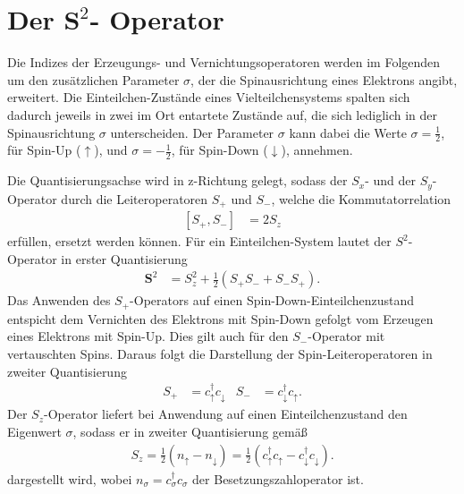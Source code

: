 \section{Der \texorpdfstring{$\symbf{S}^2$}{TEXT}- Operator}

Die Indizes der Erzeugungs- und Vernichtungsoperatoren werden im Folgenden um den zusätzlichen Parameter $\sigma$, der die Spinausrichtung eines Elektrons angibt, erweitert.
Die Einteilchen-Zustände eines Vielteilchensystems spalten sich dadurch jeweils in zwei im Ort entartete Zustände auf, die sich lediglich in der Spinausrichtung $\sigma$ unterscheiden.
Der Parameter $\sigma$ kann dabei die Werte $\sigma = \frac12$, für Spin-Up ($\uparrow$), und $\sigma = -\frac12$, für Spin-Down ($\downarrow$), annehmen.

Die Quantisierungsachse wird in z-Richtung gelegt, sodass der $S_x$- und der $S_y$-Operator durch die
Leiteroperatoren $S_+$ und $S_-$, welche die Kommutatorrelation
\begin{align}
  \left[ S_+ , S_- \right] & = 2 S_z
  \label{eqn:skommutator}
\end{align}
erfüllen, ersetzt werden können. Für ein Einteilchen-System lautet der $S^2$-Operator in erster Quantisierung
\begin{align}
  \symbf{S}^2 & = S_z^2 + \frac12 \left( S_+ S_- + S_- S_+ \right).
  \label{eqn:squadoperatorein}
\end{align}
Das Anwenden des $S_+$-Operators auf einen Spin-Down-Einteilchenzustand entspicht dem Vernichten des Elektrons mit Spin-Down gefolgt vom Erzeugen
eines Elektrons mit Spin-Up. Dies gilt auch für den $S_-$-Operator mit vertauschten Spins. Daraus folgt die Darstellung der Spin-Leiteroperatoren in zweiter Quantisierung
\begin{align}
  S_+ & = c_\uparrow^\dag c_\downarrow^{\phantom{\dag}} & S_- & = c_\downarrow^\dag c_\uparrow^{\phantom{\dag}}. \label{eqn:leitersecondquant}
\end{align}
Der $S_z$-Operator liefert bei Anwendung auf einen Einteilchenzustand den Eigenwert $\sigma$, sodass er in zweiter Quantisierung gemäß
\begin{align}
  S_z = \frac12 (n_\uparrow - n_\downarrow) = \frac12 (c_\uparrow^\dag c_\uparrow^{\phantom{\dag}} - c_\downarrow^\dag c_\downarrow^{\phantom{\dag}}) \label{eqn:szsecondquant}.
\end{align}
dargestellt wird, wobei $n_\sigma = c_\sigma^{\dag}c_\sigma^{\phantom{\dag}}$ der Besetzungszahloperator ist.

